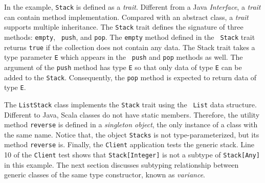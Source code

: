 In the example, {\tt Stack} is defined as a {\it trait}.  Different from a
Java {\it Interface}, a {\it trait} can contain method implementation.  
Compared with an abstract class, a {\it trait} supports multiple inheritance.  The 
{\tt Stack} trait defines the signature of three methods: {\tt empty}, {\tt 
push}, and {\tt pop}.  The {\tt empty} method defined in the {\tt 
Stack} trait returns {\tt true} if the collection does not contain any data.  
The {Stack} trait takes a type parameter {\tt E} which appears in the {\tt 
push} and {\tt pop} methods as well.  The argument of the {\tt push} method has type 
{\tt E} so that only data of type {\tt E} can be added to the {\tt Stack}.  
Consequently, the {\tt pop} method is expected to return data of type {\tt E}.

The {\tt ListStack} class implements the {\tt Stack} trait using the {\tt 
List} data structure. Different to Java, Scala classes do not have static 
members.  Therefore, the utility method {\tt reverse} is defined in a {\it 
singleton object}, the only instance of a class with the same name.  Notice 
that, the object {\tt Stacks} is not type-parameterized, but its method 
{\tt reverse} is.  Finally, the {\tt Client} application tests the generic 
stack.  Line 10 of the {\tt Client} test shows that {\tt Stack[Integer]}
is not a subtype of {\tt Stack[Any]} in this example.  The next section discusses
subtyping relationship between generic classes of the same type constructor, known
as {\it variance}.

